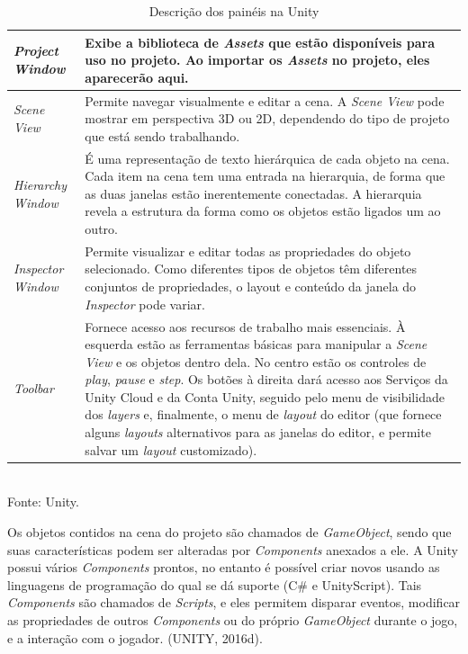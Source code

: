 \documentclass[12pt,a4paper]{article}
\newcommand{\source}[1]{\small Fonte: {#1}}
\begin{document}
			\begin{table}[ht]
				\caption{Descrição dos painéis na Unity}
				\centering
				\small
				\renewcommand{\arraystretch}{1.2} %
				\begin{tabular}{m{3.2cm} m{11.8cm}}
					\hline 
					\textit{Project Window} & Exibe a biblioteca de \textit{Assets} que estão disponíveis para uso no projeto. Ao importar os \textit{Assets} no projeto, eles aparecerão aqui. \\ 
					\hline 
					\textit{Scene View} & Permite navegar visualmente e editar a cena. A \textit{Scene View} pode mostrar em perspectiva 3D ou 2D, dependendo do tipo de projeto que está sendo trabalhando. \\ 
					\hline 
					\textit{Hierarchy Window} & É uma representação de texto hierárquica de cada objeto na cena. Cada item na cena tem uma entrada na hierarquia, de forma que as duas janelas estão inerentemente conectadas. A hierarquia revela a estrutura da forma como os objetos estão ligados um ao outro. \\ 
					\hline 
					\textit{Inspector Window} & Permite visualizar e editar todas as propriedades do objeto selecionado. Como diferentes tipos de objetos têm diferentes conjuntos de propriedades, o layout e conteúdo da janela do \textit{Inspector} pode variar. \\ 
					\hline 
					\textit{Toolbar} & Fornece acesso aos recursos de trabalho mais essenciais. À esquerda estão as ferramentas básicas para manipular a \textit{Scene View} e os objetos dentro dela. No centro estão os controles de \textit{play}, \textit{pause} e \textit{step}. Os botões à direita dará acesso aos Serviços da Unity Cloud e da Conta Unity, seguido pelo menu de visibilidade dos \textit{layers} e, finalmente, o menu de \textit{layout} do editor (que fornece alguns \textit{layouts} alternativos para as janelas do editor, e permite salvar um \textit{layout} customizado). \\ 
					\hline 
				\end{tabular}\\
				\vspace{3mm}
				\source{Unity.}
				\label{tab:unity}
			\end{table}
			
			Os objetos contidos na cena do projeto são chamados de \textit{GameObject},
			sendo que suas características podem ser alteradas por \textit{Components} anexados a ele.
			A Unity possui vários \textit{Components} prontos,
			no entanto é possível criar novos usando as linguagens de programação do qual se dá suporte (C\# e UnityScript).
			Tais \textit{Components} são chamados de \textit{Scripts},
			e eles permitem disparar eventos,
			modificar as propriedades de outros \textit{Components} ou do próprio \textit{GameObject} durante o jogo,
			e a interação com o jogador.
			(UNITY, 2016d).
\end{document}
